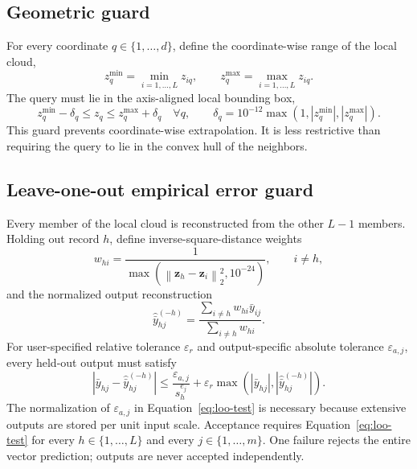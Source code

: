 \documentclass[11pt]{article}
\newcommand{\norm}[1]{\left\lVert #1\right\rVert_2}
\newcommand{\abs}[1]{\left\lvert #1\right\rvert}
\begin{document}
\subsection{Geometric guard}

For every coordinate $q\in\{1,\ldots,d\}$, define the coordinate-wise range of the local cloud,
\begin{equation}
  z_q^{\min}=\min_{i=1,\ldots,L}z_{iq},
  \qquad
  z_q^{\max}=\max_{i=1,\ldots,L}z_{iq}.
\end{equation}
The query must lie in the axis-aligned local bounding box,
\begin{equation}
  z_q^{\min}-\delta_q\leq z_q\leq z_q^{\max}+\delta_q
  \quad\forall q,
  \qquad
  \delta_q=10^{-12}\max\left(1,\abs{z_q^{\min}},\abs{z_q^{\max}}\right).
  \label{eq:box}
\end{equation}
This guard prevents coordinate-wise extrapolation.  It is less restrictive than requiring the
query to lie in the convex hull of the neighbors.

\subsection{Leave-one-out empirical error guard}

Every member of the local cloud is reconstructed from the other $L-1$ members.  Holding out record
$h$, define inverse-square-distance weights
\begin{equation}
  w_{hi}=\frac{1}{\max\!\left(
  \norm{\boldsymbol{z}_h-\boldsymbol{z}_i}^{2},10^{-24}\right)},
  \qquad i\neq h,
  \label{eq:loo-weight}
\end{equation}
and the normalized output reconstruction
\begin{equation}
  \widehat{\bar y}_{hj}^{(-h)}
  =\frac{\displaystyle\sum_{i\neq h}w_{hi}\bar y_{ij}}
  {\displaystyle\sum_{i\neq h}w_{hi}}.
  \label{eq:loo-prediction}
\end{equation}
For user-specified relative tolerance $\varepsilon_r$ and output-specific absolute tolerance
$\varepsilon_{a,j}$, every held-out output must satisfy
\begin{equation}
  \abs{\bar y_{hj}-\widehat{\bar y}_{hj}^{(-h)}}
  \leq
  \frac{\varepsilon_{a,j}}{s_h^{e_j}}
  +\varepsilon_r\max\left(
    \abs{\bar y_{hj}},
    \abs{\widehat{\bar y}_{hj}^{(-h)}}
  \right).
  \label{eq:loo-test}
\end{equation}
The normalization of $\varepsilon_{a,j}$ in Equation~\eqref{eq:loo-test} is necessary because
extensive outputs are stored per unit input scale.  Acceptance requires Equation~\eqref{eq:loo-test}
for every $h\in\{1,\ldots,L\}$ and every $j\in\{1,\ldots,m\}$.  One failure rejects the entire
vector prediction; outputs are never accepted independently.
\end{document}
